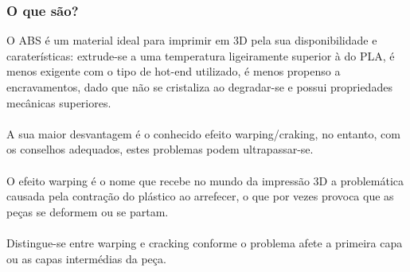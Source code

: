 \documentclass[11pt,a4paper]{article}
\begin{document}
		\subsubsection{O que são?}O ABS é um material ideal para imprimir em 3D pela sua disponibilidade e caraterísticas: extrude-se a uma temperatura ligeiramente superior à do PLA, é menos exigente com o tipo de hot-end utilizado, é menos propenso a encravamentos, dado que não se cristaliza ao degradar-se e possui propriedades mecânicas superiores.
\\\\
A sua maior desvantagem é o conhecido efeito warping/craking, no entanto, com os conselhos adequados, estes problemas podem ultrapassar-se.
\\\\
O efeito warping é o nome que recebe no mundo da impressão 3D a problemática causada pela contração do plástico ao arrefecer, o que por vezes provoca que as peças se deformem ou se partam.
\\\\
Distingue-se entre warping e cracking conforme o problema afete a primeira capa ou as capas intermédias da peça.
\end{document}
